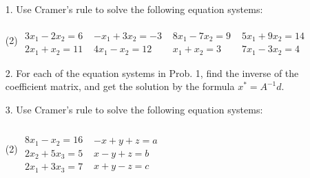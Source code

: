 \documentclass{./../../Latex/homework}
\begin{document}
\begin{enumerate}

\item[1.] Use Cramer's rule to solve the following equation systems:
\vspace{-0.75cm}
\begin{tasks}(2)
\task  $\begin{aligned} \\
	3x_1-2x_2 = 6 \\
	2x_1 + x_2 =11
\end{aligned}$  \vspace{-0.75cm}
\task $\begin{aligned} \\
	-x_1+3x_2 =-3 \\
	4x_1-x_2 = 12 
\end{aligned}$ \vspace{-0.75cm}
\task $\begin{aligned} \\
	8x_1-7x_2 =9 \\
	x_1 + x_2 = 3
\end{aligned}$ \vspace{-0.75cm}
\task $\begin{aligned} \\
	5x_1 + 9x_2 = 14 \\
	7 x_1-3x_2 = 4
\end{aligned}$ 
\end{tasks} 

\item[2.] For each of the equation systems in Prob. 1, find the inverse of the coefficient matrix, and get the solution by the formula $x^{*}=A^{-1} d$.

\item[3.] Use Cramer's rule to solve the following equation systems:
\vspace{-1.25cm}
\begin{tasks}(2)
\task[(a)]  $\begin{aligned} \\~\\
	8 x_{1}-x_{2}=16 \\
	2x_2 + 5 x_3 = 5 \\
	2x_1 + 3x_3 = 7
\end{aligned}$  \vspace{-1.25cm}
\task[(d)] $\begin{aligned} \\~\\
	-x + y+z = a \\
	x-y + z = b \\
	x+y-z = c
\end{aligned}$ 
\end{tasks} 

\end{enumerate}
\end{document}

